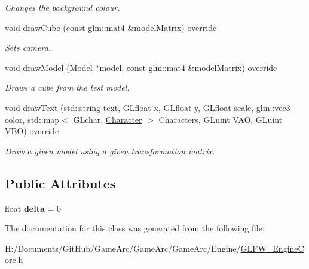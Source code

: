 \begin{DoxyCompactItemize}
\begin{DoxyCompactList}\small\item\em Changes the background colour. \end{DoxyCompactList}\item 
\hypertarget{class_g_l_f_w___engine_core_a728d1f6ffd1e8526611ab0856db537c0}{void \hyperlink{class_g_l_f_w___engine_core_a728d1f6ffd1e8526611ab0856db537c0}{draw\+Cube} (const glm\+::mat4 \&model\+Matrix) override}\label{class_g_l_f_w___engine_core_a728d1f6ffd1e8526611ab0856db537c0}

\begin{DoxyCompactList}\small\item\em Sets camera. \end{DoxyCompactList}\item 
\hypertarget{class_g_l_f_w___engine_core_abee5bb01d70b20b2b3b79e29940a7027}{void \hyperlink{class_g_l_f_w___engine_core_abee5bb01d70b20b2b3b79e29940a7027}{draw\+Model} (\hyperlink{class_model}{Model} $\ast$model, const glm\+::mat4 \&model\+Matrix) override}\label{class_g_l_f_w___engine_core_abee5bb01d70b20b2b3b79e29940a7027}

\begin{DoxyCompactList}\small\item\em Draws a cube from the test model. \end{DoxyCompactList}\item 
\hypertarget{class_g_l_f_w___engine_core_a6fe7117af3b6fb2417e0220bc2d0699a}{void \hyperlink{class_g_l_f_w___engine_core_a6fe7117af3b6fb2417e0220bc2d0699a}{draw\+Text} (std\+::string text, G\+Lfloat x, G\+Lfloat y, G\+Lfloat scale, glm\+::vec3 color, std\+::map$<$ G\+Lchar, \hyperlink{struct_character}{Character} $>$ Characters, G\+Luint V\+A\+O, G\+Luint V\+B\+O) override}\label{class_g_l_f_w___engine_core_a6fe7117af3b6fb2417e0220bc2d0699a}

\begin{DoxyCompactList}\small\item\em Draw a given model using a given transformation matrix. \end{DoxyCompactList}\end{DoxyCompactItemize}
\subsection*{Public Attributes}
\begin{DoxyCompactItemize}
\item 
\hypertarget{class_g_l_f_w___engine_core_aeffcd56c9c7f9037b3f2207385680f93}{float {\bfseries delta} = 0}\label{class_g_l_f_w___engine_core_aeffcd56c9c7f9037b3f2207385680f93}

\end{DoxyCompactItemize}


The documentation for this class was generated from the following file\+:\begin{DoxyCompactItemize}
\item 
H\+:/\+Documents/\+Git\+Hub/\+Game\+Arc/\+Game\+Arc/\+Game\+Arc/\+Engine/\hyperlink{_g_l_f_w___engine_core_8h}{G\+L\+F\+W\+\_\+\+Engine\+Core.\+h}\end{DoxyCompactItemize}
